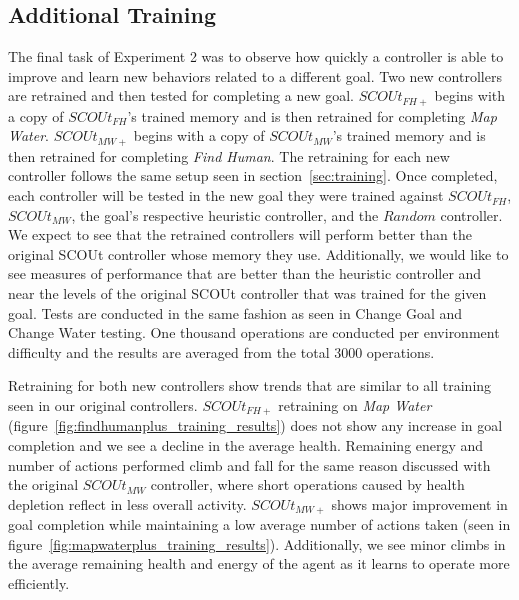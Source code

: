 \subsection{Additional Training}
The final task of Experiment 2 was to observe how quickly a controller is able to improve and learn new behaviors related to a different goal.
Two new controllers are retrained and then tested for completing a new goal.
$SCOUt_{FH+}$ begins with a copy of $SCOUt_{FH}$'s trained memory and is then retrained for completing \textit{Map Water}.
$SCOUt_{MW+}$ begins with a copy of $SCOUt_{MW}$'s trained memory and is then retrained for completing \textit{Find Human}.
The retraining for each new controller follows the same setup seen in section~\ref{sec:training}.
Once completed, each controller will be tested in the new goal they were trained against $SCOUt_{FH}$, $SCOUt_{MW}$, the goal's respective heuristic controller, and the $Random$ controller.
We expect to see that the retrained controllers will perform better than the original SCOUt controller whose memory they use.
Additionally, we would like to see measures of performance that are better than the heuristic controller and near the levels of the original SCOUt controller that was trained for the given goal.
Tests are conducted in the same fashion as seen in Change Goal and Change Water testing.
One thousand operations are conducted per environment difficulty and the results are averaged from the total 3000 operations.

Retraining for both new controllers show trends that are similar to all training seen in our original controllers.
$SCOUt_{FH+}$ retraining on \textit{Map Water} (figure~\ref{fig:findhumanplus_training_results}) does not show any increase in goal completion and we see a decline in the average health.
Remaining energy and number of actions performed climb and fall for the same reason discussed with the original $SCOUt_{MW}$ controller, where short operations caused by health depletion reflect in less overall activity.
$SCOUt_{MW+}$ shows major improvement in goal completion while maintaining a low average number of actions taken (seen in figure~\ref{fig:mapwaterplus_training_results}).
Additionally, we see minor climbs in the average remaining health and energy of the agent as it learns to operate more efficiently.


